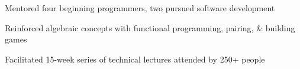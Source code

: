 \documentclass[letterpaper]{deedy-resume} %
\begin{document}
\begin{minipage}[t]{0.66\textwidth}

%
\begin{tightitemize}
\item Mentored four beginning programmers, two pursued software development  
\end{tightitemize}
%
\sectionspace %



\begin{tightitemize}
\item Reinforced algebraic concepts with functional programming, pairing, \& building games
\end{tightitemize}

\sectionspace %



\begin{tightitemize}
\item Facilitated 15-week series of technical lectures attended by 250+ people
\end{tightitemize}

\sectionspace %

%
%
%
%


\end{minipage}
\end{document}
